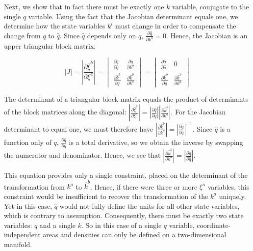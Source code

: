 \documentclass[letterpaper]{article}
\begin{document}
Next, we show that in fact there must be exactly one $k$ variable, conjugate to the single $q$ variable. Using the fact that the Jacobian determinant equals one, we determine how the state variables $k^i$ must change in order to compensate the change from $q$ to $\hat q$. Since $\hat{q}$ depends only on $q$, $\frac{\partial \hat{q}}{\partial k^a} = 0$. Hence, the Jacobian is an upper triangular block matrix: 



\begin{equation}
|J| = \left|\frac{\partial \hat{\xi}^b}{\partial \xi^a} \right| = \begin{vmatrix}
\frac{\partial \hat{q}}{\partial q} & \frac{\partial \hat{q}}{\partial k^a} \\
\frac{\partial \hat{k}^b}{\partial q} & \frac{\partial \hat{k}^b}{\partial  k^a} 
\end{vmatrix} = \begin{vmatrix}
\frac{\partial \hat{q}}{\partial q} & 0 \\
\frac{\partial \hat{k}^b}{\partial q} & \frac{\partial \hat{k}^b}{\partial  k^a}
\end{vmatrix}
\end{equation}

\noindent
The determinant of a triangular block matrix equals the product of determinants of the block matrices along the diagonal: $ \left|\frac{\partial \hat{\xi}^b}{\partial \xi^a} \right| =  \left|\frac{\partial \hat{q}}{\partial q}\right| \left|\frac{\partial \hat{k}^b}{\partial k^a}\right|$. For the Jacobian determinant to equal one, we must therefore have $\left|\frac{\partial \hat{k}^b}{\partial k^a} \right| =   \left|\frac{\partial \hat{q}}{\partial q}\right|^{-1}$. Since $\hat q$ is a function only of $q$, $\frac{\partial \hat{q}}{\partial q}$ is a total derivative, so we obtain the inverse by swapping the numerator and denominator. Hence, we see that $\left|\frac{\partial \hat{k}^b}{\partial k^a} \right| = \left|\frac{\partial q}{\partial \hat q} \right|$. 

This equation provides only a single constraint, placed on the determinant of the transformation from $k^a$ to $\hat{k}^b$. Hence, if there were three or more $\xi^a$ variables, this constraint would be insufficient to recover the transformation of the $k^a$ uniquely. Yet in this case, $\hat q$  would not fully define the units for all other state variables, which is contrary to assumption. Consequently, there must be exactly two state variables: $q$ and a single $k$. So in this case of a single $q$ variable, coordinate-independent areas and densities can only be defined on a two-dimensional manifold.
\end{document}
